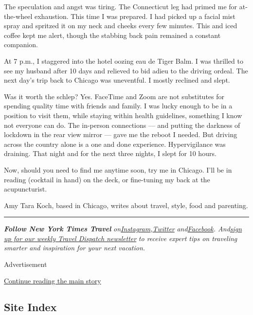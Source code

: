 The speculation and angst was tiring. The Connecticut leg had primed me
for at-the-wheel exhaustion. This time I was prepared. I had picked up a
facial mist spray and spritzed it on my neck and cheeks every few
minutes. This and iced coffee kept me alert, though the stabbing back
pain remained a constant companion.

At 7 p.m., I staggered into the hotel oozing eau de Tiger Balm. I was
thrilled to see my husband after 10 days and relieved to bid adieu to
the driving ordeal. The next day's trip back to Chicago was uneventful.
I mostly reclined and slept.

Was it worth the schlep? Yes. FaceTime and Zoom are not substitutes for
spending quality time with friends and family. I was lucky enough to be
in a position to visit them, while staying within health guidelines,
something I know not everyone can do. The in-person connections --- and
putting the darkness of lockdown in the rear view mirror --- gave me the
reboot I needed. But driving across the country alone is a one and done
experience. Hypervigilance was draining. That night and for the next
three nights, I slept for 10 hours.

Now, should you need to find me anytime soon, try me in Chicago. I'll be
in reading (cocktail in hand) on the deck, or fine-tuning my back at the
acupuncturist.

Amy Tara Koch, based in Chicago, writes about travel, style, food and
parenting.

\begin{center}\rule{0.5\linewidth}{\linethickness}\end{center}

\emph{\textbf{Follow New York Times Travel}}
\emph{on}\href{https://www.instagram.com/nytimestravel/}{\emph{Instagram}}\emph{,}\href{https://twitter.com/nytimestravel}{\emph{Twitter}}
\emph{and}\href{https://www.facebook.com/nytimestravel/}{\emph{Facebook}}\emph{.
And}\href{https://www.nytimes.com/newsletters/traveldispatch}{\emph{sign
up for our weekly Travel Dispatch newsletter}} \emph{to receive expert
tips on traveling smarter and inspiration for your next vacation.}

Advertisement

\protect\hyperlink{after-bottom}{Continue reading the main story}

\hypertarget{site-index}{%
\subsection{Site Index}\label{site-index}}


